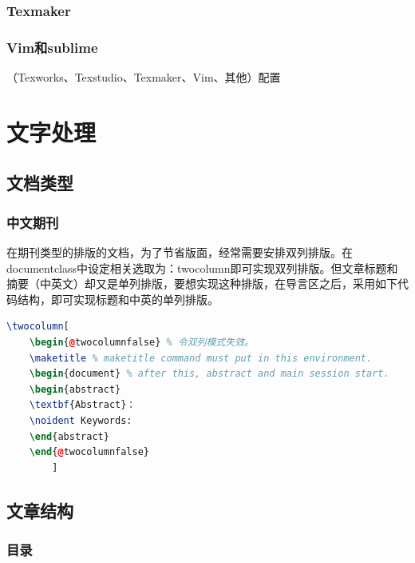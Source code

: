 \documentclass[12pt]{book}
\begin{document}
\subsection{Texmaker}

\subsection{Vim和sublime}
（Texworks、Texstudio、Texmaker、Vim、其他）配置
\chapter{文字处理}

\section{文档类型}

\subsection{中文期刊}

在期刊类型的排版的文档，为了节省版面，经常需要安排双列排版。在documentclass中设定相关选取为：twocolumn即可实现双列排版。但文章标题和摘要（中英文）却又是单列排版，要想实现这种排版，在导言区之后，采用如下代码结构，即可实现标题和中英的单列排版。

\begin{lstlisting}[language=tex,breaklines]
	\twocolumn[
	\begin{@twocolumnfalse} % 令双列模式失效。
	\maketitle % maketitle command must put in this environment.
	\begin{document} % after this, abstract and main session start.
	\begin{abstract}
	\textbf{Abstract}：
	\noident Keywords:
	\end{abstract}
	\end{@twocolumnfalse}
		]	
\end{lstlisting}

\section{文章结构}


\subsection{目录}
\end{document}
